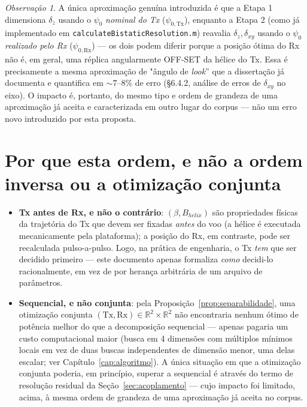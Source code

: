 \documentclass[12pt,a4paper,oneside]{book}
\theoremstyle{definition}
\theoremstyle{remark}
\newtheorem*{observacao}{Observação}
\newcommand{\dxy}{\delta_{xy}}
\newcommand{\dz}{\delta_z}
\newcommand{\psiT}{\psi_{0,\mathrm{Tx}}}
\newcommand{\psiR}{\psi_{0,\mathrm{Rx}}}
\begin{document}
\begin{observacao}
A única aproximação genuína introduzida é que a Etapa 1 dimensiona
$\dz$ usando o $\psi_0$ \emph{nominal do Tx} ($\psiT$), enquanto a Etapa 2
(como já implementado em \texttt{calculateBistaticResolution.m}) reavalia
$\dz,\dxy$ usando o $\psi_0$ \emph{realizado pelo Rx} ($\psiR$) — os dois
podem diferir porque a posição ótima do Rx não é, em geral, uma réplica
angularmente OFF-SET da hélice do Tx. Essa é precisamente a mesma
aproximação de "ângulo de \textit{look}'' que a dissertação já documenta e
quantifica em $\sim\!7\text{--}8\%$ de erro (§6.4.2, análise de erros de
$\dxy$ no eixo). O impacto é, portanto, do mesmo tipo e ordem de grandeza
de uma aproximação já aceita e caracterizada em outro lugar do corpus —
não um erro novo introduzido por esta proposta.
\end{observacao}

\section{Por que esta ordem, e não a ordem inversa ou a otimização conjunta}

\begin{itemize}
  \item \textbf{Tx antes de Rx, e não o contrário}: $(\beta,B_{helix})$
  são propriedades físicas da trajetória do Tx que devem ser fixadas
  \emph{antes} do voo (a hélice é executada mecanicamente pela
  plataforma); a posição do Rx, em contraste, pode ser recalculada
  pulso-a-pulso. Logo, na prática de engenharia, o Tx \emph{tem} que ser
  decidido primeiro — este documento apenas formaliza \emph{como}
  decidi-lo racionalmente, em vez de por herança arbitrária de um arquivo
  de parâmetros.

  \item \textbf{Sequencial, e não conjunta}: pela
  Proposição~\ref{prop:separabilidade}, uma otimização conjunta
  $(\mathrm{Tx},\mathrm{Rx})\in\mathbb{R}^2\times\mathbb{R}^2$ não
  encontraria nenhum ótimo de potência melhor do que a decomposição
  sequencial — apenas pagaria um custo computacional maior (busca em
  4 dimensões com múltiplos mínimos locais em vez de duas buscas
  independentes de dimensão menor, uma delas escalar; ver
  Capítulo~\ref{cap:algoritmo}). A única situação em que a otimização
  conjunta poderia, em princípio, superar a sequencial é através do termo
  de resolução residual da Seção~\ref{sec:acoplamento} — cujo impacto foi
  limitado, acima, à mesma ordem de grandeza de uma aproximação já aceita
  no corpus.
\end{itemize}
\end{document}
